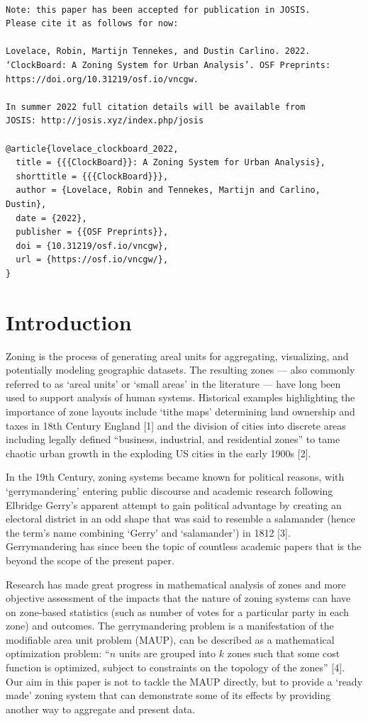 \documentclass{josis}
\begin{document}
\newpage

\begin{verbatim}

Note: this paper has been accepted for publication in JOSIS.
Please cite it as follows for now:

Lovelace, Robin, Martijn Tennekes, and Dustin Carlino. 2022.
‘ClockBoard: A Zoning System for Urban Analysis’. OSF Preprints:
https://doi.org/10.31219/osf.io/vncgw.

In summer 2022 full citation details will be available from 
JOSIS: http://josis.xyz/index.php/josis

@article{lovelace_clockboard_2022,
  title = {{{ClockBoard}}: A Zoning System for Urban Analysis},
  shorttitle = {{{ClockBoard}}},
  author = {Lovelace, Robin and Tennekes, Martijn and Carlino, Dustin},
  date = {2022},
  publisher = {{OSF Preprints}},
  doi = {10.31219/osf.io/vncgw},
  url = {https://osf.io/vncgw/},
}
\end{verbatim}

\hypertarget{introduction}{%
\section{Introduction}\label{introduction}}

Zoning is the process of generating areal units for aggregating, visualizing, and potentially modeling geographic datasets.
The resulting zones --- also commonly referred to as `areal units' or `small areas' in the literature --- have long been used to support analysis of human systems.
Historical examples highlighting the importance of zone layouts include `tithe maps' determining land ownership and taxes in 18th Century England {[}1{]} and the division of cities into discrete areas including legally defined ``business, industrial, and residential zones'' to tame chaotic urban growth in the exploding US cities in the early 1900s {[}2{]}.

In the 19th Century, zoning systems became known for political reasons, with `gerrymandering' entering public discourse and academic research following Elbridge Gerry's apparent attempt to gain political advantage by creating an electoral district in an odd shape that was said to resemble a salamander (hence the term's name combining `Gerry' and `salamander') in 1812 {[}3{]}.
Gerrymandering has since been the topic of countless academic papers that is the beyond the scope of the present paper.

Research has made great progress in mathematical analysis of zones and more objective assessment of the impacts that the nature of zoning systems can have on zone-based statistics (such as number of votes for a particular party in each zone) and outcomes.
The gerrymandering problem is a manifestation of the modifiable area unit problem (MAUP), can be described as a mathematical optimization problem: ``\(n\) units are grouped into \(k\) zones such that some cost function is optimized, subject to constraints on the topology of the zones'' {[}4{]}.
Our aim in this paper is not to tackle the MAUP directly, but to provide a `ready made' zoning system that can demonstrate some of its effects by providing another way to aggregate and present data.
\end{document}
